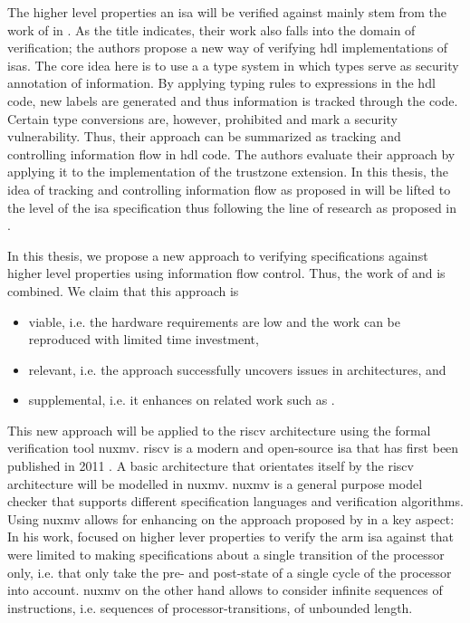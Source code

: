 The higher level properties an \gls{isa} will be verified against mainly stem from the work of \citeauthor{Ferraiuolo17} in  \cite{Ferraiuolo17}.
As the title indicates, their work also falls into the domain of verification; the authors propose a new way of verifying \gls{hdl} implementations of \glspl{isa}.
The core idea here is to use a a type system in which types serve as security annotation of information.
By applying typing rules to expressions in the \gls{hdl} code, new labels are generated and thus information is tracked through the code.
Certain type conversions are, however, prohibited and mark a security vulnerability.
Thus, their approach can be summarized as tracking and controlling information flow in \gls{hdl} code.
The authors evaluate their approach by applying it to the implementation of the \gls{trustzone} extension.
In this thesis, the idea of tracking and controlling information flow as proposed in \cite{Ferraiuolo17} will be lifted to the level of the \gls{isa} specification thus following the line of research as proposed in \cite{Reid17}.

In this thesis, we propose a new approach to verifying specifications against higher level properties using information flow control.
Thus, the work of \citeauthor{Reid17} \cite{Reid17} and \citeauthor{Ferraiuolo17} \cite{Ferraiuolo17} is combined.
We claim that this approach is
\begin{itemize}
    \item viable, i.e. the hardware requirements are low and the work can be reproduced with limited time investment,
    \item relevant, i.e. the approach successfully uncovers issues in architectures, and
    \item supplemental, i.e. it enhances on related work such as \cite{Reid17}.
\end{itemize}

This new approach will be applied to the \gls{riscv} architecture using the formal verification tool \gls{nuxmv}.
\Gls{riscv} is a modern and open-source \gls{isa} that has first been published in 2011 \citeauthor{RiscVISA-org}.
A basic architecture that orientates itself by the \gls{riscv} architecture will be modelled in \gls{nuxmv}.
\gls{nuxmv} is a general purpose model checker that supports different specification languages and verification algorithms.
Using \gls{nuxmv} allows for enhancing on the approach proposed by \citeauthor{Reid17} in a key aspect:
In his work, \citeauthor{Reid17} focused on higher lever properties to verify the \gls{arm} \gls{isa} against that were limited to making specifications about a single transition of the processor only, i.e. that only take the pre- and post-state of a single cycle of the processor into account.
\gls{nuxmv} on the other hand allows to consider infinite sequences of instructions, i.e. sequences of processor-transitions, of unbounded length.

